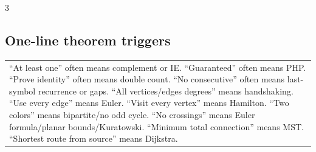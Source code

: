 \documentclass[10pt]{article}
\begin{document}
\begin{multicols*}{3}
\subsection*{One-line theorem triggers}
\begin{tabular}{@{}p{}@{}}
``At least one'' often means complement or IE. ``Guaranteed'' often means PHP. ``Prove identity'' often means double count. ``No consecutive'' often means last-symbol recurrence or gaps. ``All vertices/edges degrees'' means handshaking. ``Use every edge'' means Euler. ``Visit every vertex'' means Hamilton. ``Two colors'' means bipartite/no odd cycle. ``No crossings'' means Euler formula/planar bounds/Kuratowski. ``Minimum total connection'' means MST. ``Shortest route from source'' means Dijkstra.\\
\end{tabular}

\end{multicols*}
\end{document}
